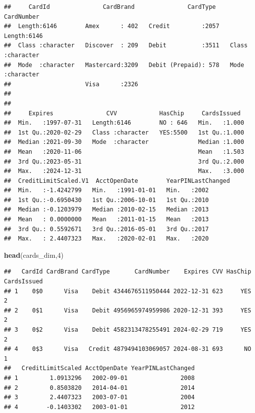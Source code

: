\documentclass[
]{article}
\newenvironment{Shaded}{\begin{snugshade}}{\end{snugshade}}
\newcommand{\DecValTok}[1]{\textcolor[rgb]{0.00,0.00,0.81}{#1}}
\newcommand{\FunctionTok}[1]{\textcolor[rgb]{0.13,0.29,0.53}{\textbf{#1}}}
\newcommand{\NormalTok}[1]{#1}
\begin{document}
\begin{verbatim}
##     CardId               CardBrand               CardType     CardNumber       
##  Length:6146        Amex      : 402   Credit         :2057   Length:6146       
##  Class :character   Discover  : 209   Debit          :3511   Class :character  
##  Mode  :character   Mastercard:3209   Debit (Prepaid): 578   Mode  :character  
##                     Visa      :2326                                            
##                                                                                
##                                                                                
##     Expires               CVV            HasChip     CardsIssued   
##  Min.   :1997-07-31   Length:6146        NO : 646   Min.   :1.000  
##  1st Qu.:2020-02-29   Class :character   YES:5500   1st Qu.:1.000  
##  Median :2021-09-30   Mode  :character              Median :1.000  
##  Mean   :2020-11-06                                 Mean   :1.503  
##  3rd Qu.:2023-05-31                                 3rd Qu.:2.000  
##  Max.   :2024-12-31                                 Max.   :3.000  
##  CreditLimitScaled.V1  AcctOpenDate        YearPINLastChanged
##  Min.   :-1.4242799   Min.   :1991-01-01   Min.   :2002      
##  1st Qu.:-0.6950430   1st Qu.:2006-10-01   1st Qu.:2010      
##  Median :-0.1203979   Median :2010-02-15   Median :2013      
##  Mean   : 0.0000000   Mean   :2011-01-15   Mean   :2013      
##  3rd Qu.: 0.5592671   3rd Qu.:2016-05-01   3rd Qu.:2017      
##  Max.   : 2.4407323   Max.   :2020-02-01   Max.   :2020
\end{verbatim}

\begin{Shaded}
\begin{Highlighting}[]
\FunctionTok{head}\NormalTok{(cards\_dim,}\DecValTok{4}\NormalTok{)}
\end{Highlighting}
\end{Shaded}

\begin{verbatim}
##   CardId CardBrand CardType       CardNumber    Expires CVV HasChip CardsIssued
## 1    0$0      Visa    Debit 4344676511950444 2022-12-31 623     YES           2
## 2    0$1      Visa    Debit 4956965974959986 2020-12-31 393     YES           2
## 3    0$2      Visa    Debit 4582313478255491 2024-02-29 719     YES           2
## 4    0$3      Visa   Credit 4879494103069057 2024-08-31 693      NO           1
##   CreditLimitScaled AcctOpenDate YearPINLastChanged
## 1         1.0913296   2002-09-01               2008
## 2         0.8503820   2014-04-01               2014
## 3         2.4407323   2003-07-01               2004
## 4        -0.1403302   2003-01-01               2012
\end{verbatim}
\end{document}
